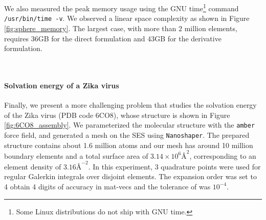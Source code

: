 We also measured the peak memory usage using the GNU time\footnote{Some Linux distributions do not ship with GNU time.} command \texttt{/usr/bin/time -v}.
We observed a linear space complexity as shown in Figure \ref{fig:sphere_memory}.
The largest case, with more than $2$ million elements, requires $36$GB for the direct formulation and $43$GB for the derivative formulation.

\begin{figure*}[t]
\centering
    \\
    \caption{Performance on a spherical molecule with 100 random charges inside;
    6 regular quadrature points per element; \fmm expansion order set to 5 to achieve 5 digits of accuracy. Problem size represented by number of elements, $N$. Evaluation time (b) is an average for 1 Laplace \fmm evaluation and 1 Yukawa \fmm evaluation across all iterations in GMRES using direct formulation.
    \textbf{c},\textbf{d}, Time breakdown of \gmres in percentage using direct formulation (\textbf{c}) and derivative formulation (\textbf{d}).}
\end{figure*}

\paragraph{Solvation energy of a Zika virus} \label{result_zika}

Finally, we present a more challenging problem that studies the solvation energy of the Zika virus (PDB code 6CO8), whose structure \cite{sevvana2018refinement} is shown in Figure \ref{fig:6CO8_assembly}.
We parameterized the molecular structure with the \texttt{amber} force field, and generated a mesh on the SES using \texttt{Nanoshaper}.
The prepared structure contains about 1.6 million atoms and our mesh has around 10 million boundary elements and a total surface area of $3.14\times 10^6 {\si{\angstrom}}^{2}$, corresponding to an element density of $3.16 {\si{\angstrom}}^{-2}$.
In this experiment, 3 quadrature points were used for regular Galerkin integrals over disjoint elements.
The \fmm expansion order was set to 4 obtain 4 digits of accuracy in mat-vecs and the tolerance of \gmres was $10^{-4}$.

